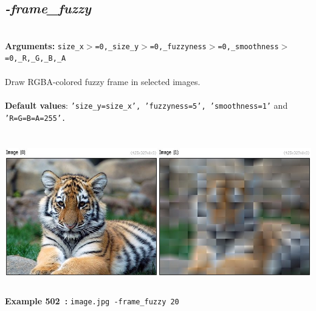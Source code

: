 \documentclass[a4paper,11pt,twoside]{book}
\begin{document}
\subsection{\emph{-frame\_fuzzy} }\vspace*{-0.5em}
~\\\textbf{Arguments: } 
{\small \texttt{size\_x$>$=0,\_size\_y$>$=0,\_fuzzyness$>$=0,\_smoothness$>$=0,\_R,\_G,\_B,\_A}}\\~\\
Draw RGBA-colored fuzzy frame in selected images.
~\\~\\\textbf{Default values}: {\small \texttt{'size\_y=size\_x', 'fuzzyness=5', 'smoothness=1'} and \texttt{'R=G=B=A=255'.}}
\begin{center}\includegraphics[keepaspectratio=true,height=7cm,width=\textwidth]{img/gmic_def502.jpg}\\
{\footnotesize \textbf{Example 502~:} \texttt{image.jpg -frame\_fuzzy 20}}
\end{center}
\end{document}

